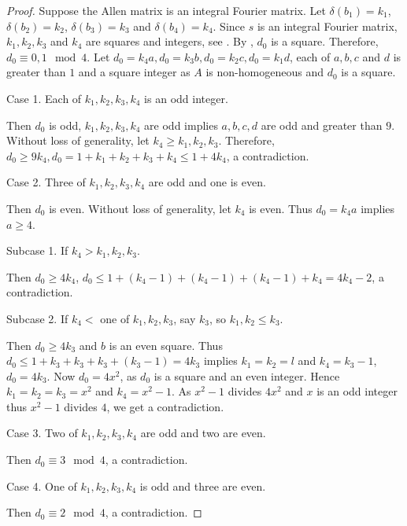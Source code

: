 \documentclass[12pt]{amsart}
\begin{document}
\begin{proof}Suppose the Allen matrix is an integral Fourier matrix. Let $\delta(b_1)=k_1$, $\delta(b_2)= k_2$, $\delta(b_3)=k_3$  and $\delta(b_4)=k_4$. Since $s$ is an integral Fourier matrix, $k_1,k_2,k_3$ and $k_4$ are squares and integers, see \cite[Lemma 12]{G1}. By \cite[Lemma 3.7]{MC1}, $d_0$ is a square. Therefore, $d_0 \equiv 0,1 \mod4$.
Let $d_0=k_4a, d_0=k_3b,d_0=k_2c,d_0=k_1d$, each of $a,b,c$ and $d$ is greater than $1$ and a square integer as $A$ is non-homogeneous and $d_0$ is a square.

\smallskip

Case 1. Each of $k_1,k_2,k_3,k_4$ is an odd integer.

Then $d_0$ is odd, $k_1,k_2,k_3,k_4$ are odd implies $a,b,c,d$ are odd and greater than $9$. Without loss of generality, let $k_4\geq k_1,k_2,k_3$. Therefore, $d_0\geq 9k_4, d_0=1+k_1+k_2+k_3+k_4\leq 1+4k_4$, a contradiction.

\smallskip

Case 2. Three of $k_1,k_2,k_3,k_4$ are  odd and one is even.

Then $d_0$ is even. Without loss of generality, let $k_4$ is even. Thus $d_0=k_4a$ implies $a\geq 4$.

\smallskip

Subcase 1. If $k_4>k_1,k_2,k_3$.

Then $d_0\geq 4k_4$, $d_0\leq 1+(k_4-1)+(k_4-1)+(k_4-1)+k_4=4k_4-2$, a contradiction.

\smallskip

Subcase 2. If $k_4<$ one of $k_1,k_2,k_3$, say $k_3$, so $k_1,k_2\leq k_3$.

Then $d_0\geq 4k_3$ and $b$ is an even square. Thus $d_0\leq 1+k_3+k_3+k_3+(k_3-1)=4k_3$ implies $k_1=k_2=l$ and $k_4=k_3-1$, $d_0=4k_3$. Now $d_0=4x^2$, as $d_0$ is a square and an even integer. Hence $k_1=k_2=k_3=x^2$ and $k_4=x^2-1$. As $x^2-1$ divides $4x^2$ and $x$ is an odd integer thus  $x^2-1$ divides $4$, we get a contradiction.

\smallskip

Case 3. Two of $k_1,k_2,k_3,k_4$ are  odd and two are even.

Then $d_0\equiv 3 \mod 4$, a contradiction. 

\smallskip

Case 4. One of $k_1,k_2,k_3,k_4$ is odd and three are even.

Then $d_0\equiv 2 \mod 4$, a contradiction. 
\end{proof}
\end{document}
